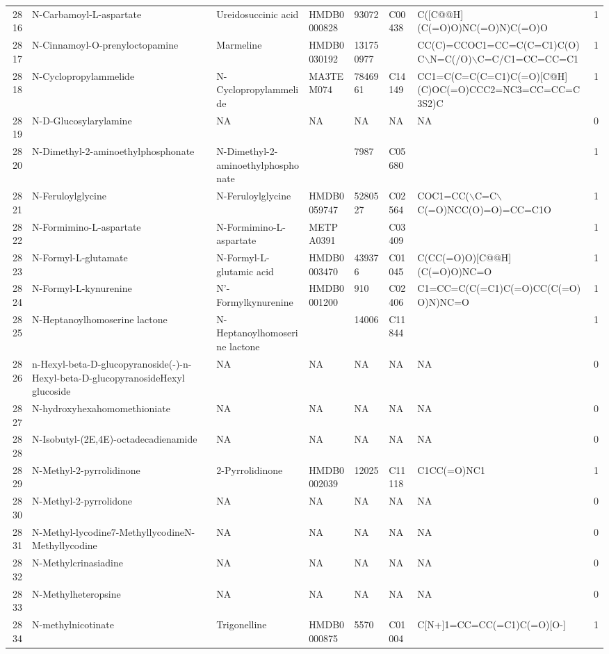 \documentclass[a4paper]{article}
\begin{document}
\begin{longtable}{rlllllll}
  2816 & N-Carbamoyl-L-aspartate & Ureidosuccinic acid & HMDB0000828 & 93072 & C00438 & C([C@@H](C(=O)O)NC(=O)N)C(=O)O & 1 \\ 
  2817 & N-Cinnamoyl-O-prenyloctopamine & Marmeline & HMDB0030192 & 131750977 &  & CC(C)=CCOC1=CC=C(C=C1)C(O)C$\backslash$N=C(/O)$\backslash$C=C/C1=CC=CC=C1 & 1 \\ 
  2818 & N-Cyclopropylammelide & N-Cyclopropylammelide & MA3TEM074 & 7846961 & C14149 & CC1=C(C=C(C=C1)C(=O)[C@H](C)OC(=O)CCC2=NC3=CC=CC=C3S2)C & 1 \\ 
  2819 & N-D-Glucosylarylamine & NA & NA & NA & NA & NA & 0 \\ 
  2820 & N-Dimethyl-2-aminoethylphosphonate & N-Dimethyl-2-aminoethylphosphonate &  & 7987 & C05680 &  & 1 \\ 
  2821 & N-Feruloylglycine & N-Feruloylglycine & HMDB0059747 & 5280527 & C02564 & COC1=CC($\backslash$C=C$\backslash$C(=O)NCC(O)=O)=CC=C1O & 1 \\ 
  2822 & N-Formimino-L-aspartate & N-Formimino-L-aspartate & METPA0391 &  & C03409 &  & 1 \\ 
  2823 & N-Formyl-L-glutamate & N-Formyl-L-glutamic acid & HMDB0003470 & 439376 & C01045 & C(CC(=O)O)[C@@H](C(=O)O)NC=O & 1 \\ 
  2824 & N-Formyl-L-kynurenine & N'-Formylkynurenine & HMDB0001200 & 910 & C02406 & C1=CC=C(C(=C1)C(=O)CC(C(=O)O)N)NC=O & 1 \\ 
  2825 & N-Heptanoylhomoserine lactone & N-Heptanoylhomoserine lactone &  & 14006 & C11844 &  & 1 \\ 
  2826 & n-Hexyl-beta-D-glucopyranoside(-)-n-Hexyl-beta-D-glucopyranosideHexyl glucoside & NA & NA & NA & NA & NA & 0 \\ 
  2827 & N-hydroxyhexahomomethioniate & NA & NA & NA & NA & NA & 0 \\ 
  2828 & N-Isobutyl-(2E,4E)-octadecadienamide & NA & NA & NA & NA & NA & 0 \\ 
  2829 & N-Methyl-2-pyrrolidinone & 2-Pyrrolidinone & HMDB0002039 & 12025 & C11118 & C1CC(=O)NC1 & 1 \\ 
  2830 & N-Methyl-2-pyrrolidone & NA & NA & NA & NA & NA & 0 \\ 
  2831 & N-Methyl-lycodine7-MethyllycodineN-Methyllycodine & NA & NA & NA & NA & NA & 0 \\ 
  2832 & N-Methylcrinasiadine & NA & NA & NA & NA & NA & 0 \\ 
  2833 & N-Methylheteropsine & NA & NA & NA & NA & NA & 0 \\ 
  2834 & N-methylnicotinate & Trigonelline & HMDB0000875 & 5570 & C01004 & C[N+]1=CC=CC(=C1)C(=O)[O-] & 1 \\ 

\end{longtable}
\end{document}
